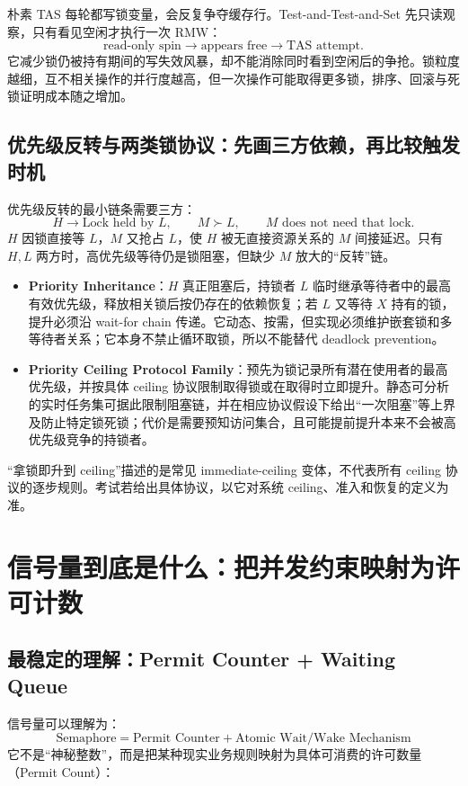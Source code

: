 \documentclass[11pt,a4paper]{ctexart}
\newcommand{\kw}[1]{\textbf{#1}}
\begin{document}
朴素 TAS 每轮都写锁变量，会反复争夺缓存行。Test-and-Test-and-Set 先只读观察，只有看见空闲才执行一次 RMW：
\[
\text{read-only spin}\to\text{appears free}\to\text{TAS attempt}.
\]
它减少锁仍被持有期间的写失效风暴，却不能消除同时看到空闲后的争抢。锁粒度越细，互不相关操作的并行度越高，但一次操作可能取得更多锁，排序、回滚与死锁证明成本随之增加。

\subsection{优先级反转与两类锁协议：先画三方依赖，再比较触发时机}

优先级反转的最小链条需要三方：
\[
H\to\text{Lock held by }L,\qquad M\succ L,\qquad M\text{ does not need that lock}.
\]
$H$ 因锁直接等 $L$，$M$ 又抢占 $L$，使 $H$ 被无直接资源关系的 $M$ 间接延迟。只有 $H,L$ 两方时，高优先级等待仍是锁阻塞，但缺少 $M$ 放大的“反转”链。

\begin{itemize}
\item \kw{Priority Inheritance}：$H$ 真正阻塞后，持锁者 $L$ 临时继承等待者中的最高有效优先级，释放相关锁后按仍存在的依赖恢复；若 $L$ 又等待 $X$ 持有的锁，提升必须沿 wait-for chain 传递。它动态、按需，但实现必须维护嵌套锁和多等待者关系；它本身不禁止循环取锁，所以不能替代 deadlock prevention。
\item \kw{Priority Ceiling Protocol Family}：预先为锁记录所有潜在使用者的最高优先级，并按具体 ceiling 协议限制取得锁或在取得时立即提升。静态可分析的实时任务集可据此限制阻塞链，并在相应协议假设下给出“一次阻塞”等上界及防止特定锁死锁；代价是需要预知访问集合，且可能提前提升本来不会被高优先级竞争的持锁者。
\end{itemize}
“拿锁即升到 ceiling”描述的是常见 immediate-ceiling 变体，不代表所有 ceiling 协议的逐步规则。考试若给出具体协议，以它对系统 ceiling、准入和恢复的定义为准。

\section{信号量到底是什么：把并发约束映射为许可计数}

\subsection{最稳定的理解：Permit Counter + Waiting Queue}

信号量可以理解为：
\[
\boxed{\text{Semaphore}=\text{Permit Counter}+\text{Atomic Wait/Wake Mechanism}}
\]
它不是“神秘整数”，而是把某种现实业务规则映射为具体可消费的许可数量（Permit Count）：
\end{document}
